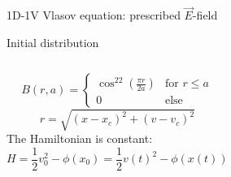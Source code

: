 \documentclass{beamer}
\begin{document}
\begin{frame}{1D-1V Vlasov equation: prescribed $\vec{E}$-field}

Initial distribution

\begin{columns}
$$ B(r,a) =
  \begin{cases}
  \cos^{22}\left(\tfrac{\pi r}{2a}\right) & \text{for } r \leq a \\
   0       & \text{else }
  \end{cases}$$
\vspace*{-3.5mm}
$$r = \sqrt{(x - x_c)^2 + (v - v_c)^2}$$ 
The Hamiltonian is constant:
$$H = \frac{1}{2}v_0^2 - \phi (x_0) = \frac{1}{2}v(t)^2 - \phi (x(t))$$
\end{columns}
 


\end{frame}
\end{document}
